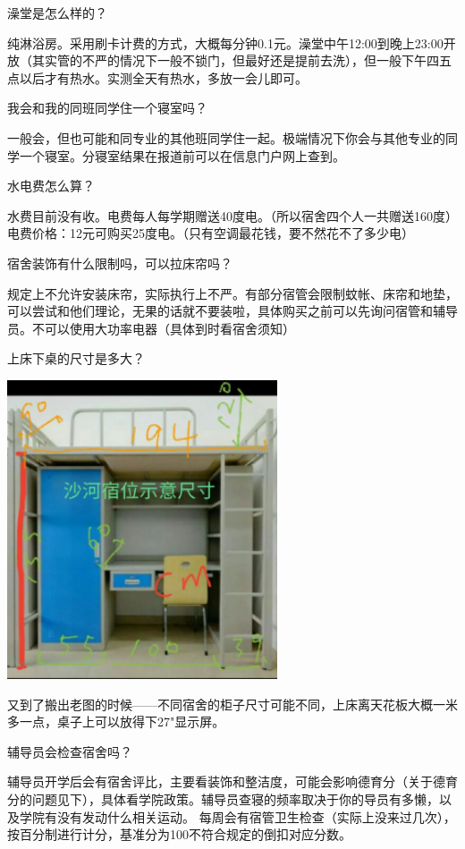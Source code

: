 \documentclass[UTF8]{ctexart}
\newcommand{\faq}[1]{{\heiti #1}}
\begin{document}
\faq{澡堂是怎么样的？}

纯淋浴房。采用刷卡计费的方式，大概每分钟0.1元。澡堂中午12:00到晚上23:00开放（其实管的不严的情况下一般不锁门，但最好还是提前去洗），但一般下午四五点以后才有热水。实测全天有热水，多放一会儿即可。

\faq{我会和我的同班同学住一个寝室吗？}

一般会，但也可能和同专业的其他班同学住一起。极端情况下你会与其他专业的同学一个寝室。分寝室结果在报道前可以在信息门户网上查到。

\faq{水电费怎么算？}

水费目前没有收。电费每人每学期赠送40度电。（所以宿舍四个人一共赠送160度）电费价格：12元可购买25度电。（只有空调最花钱，要不然花不了多少电）

\faq{宿舍装饰有什么限制吗，可以拉床帘吗？}

规定上不允许安装床帘，实际执行上不严。有部分宿管会限制蚊帐、床帘和地垫，可以尝试和他们理论，无果的话就不要装啦，具体购买之前可以先询问宿管和辅导员。不可以使用大功率电器（具体到时看宿舍须知）

\faq{上床下桌的尺寸是多大？}

\begin{center}
    \includegraphics[width=0.6\textwidth]{images/bed-size.png}
\end{center}

又到了搬出老图的时候——不同宿舍的柜子尺寸可能不同，上床离天花板大概一米多一点，桌子上可以放得下27"显示屏。

\faq{辅导员会检查宿舍吗？}

辅导员开学后会有宿舍评比，主要看装饰和整洁度，可能会影响德育分（关于德育分的问题见下），具体看学院政策。辅导员查寝的频率取决于你的导员有多懒，以及学院有没有发动什么相关运动。
每周会有宿管卫生检查（实际上没来过几次），按百分制进行计分，基准分为100不符合规定的倒扣对应分数。
\end{document}
